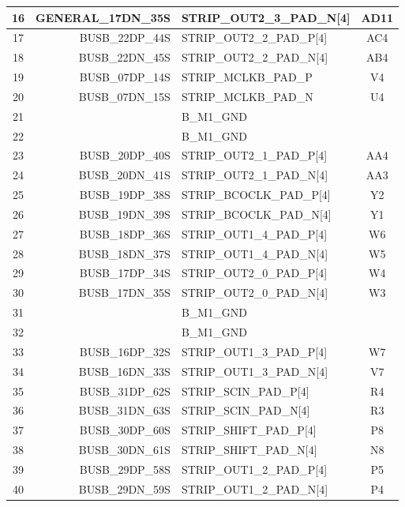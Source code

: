 \documentclass[11pt]{article}
\begin{document}
\begin{table}
\begin{center}
\begin{tabular}{|c|r|l|c|}
16 &GENERAL\_17DN\_35S &  STRIP\_OUT2\_3\_PAD\_N[4]   & AD11  \\ \hline
17 &   BUSB\_22DP\_44S &  STRIP\_OUT2\_2\_PAD\_P[4]   & AC4  \\
18 &   BUSB\_22DN\_45S &  STRIP\_OUT2\_2\_PAD\_N[4]   & AB4  \\ \hline
19 &   BUSB\_07DP\_14S &  STRIP\_MCLKB\_PAD\_P       & V4  \\
20 &   BUSB\_07DN\_15S &  STRIP\_MCLKB\_PAD\_N       & U4  \\ \hline
21 &                 &  B\_M1\_GND                &      \\
22 &                 &  B\_M1\_GND                &      \\ \hline
23 &   BUSB\_20DP\_40S &  STRIP\_OUT2\_1\_PAD\_P[4]   & AA4  \\
24 &   BUSB\_20DN\_41S &  STRIP\_OUT2\_1\_PAD\_N[4]   & AA3  \\ \hline
25 &   BUSB\_19DP\_38S &  STRIP\_BCOCLK\_PAD\_P[4]   & Y2  \\
26 &   BUSB\_19DN\_39S &  STRIP\_BCOCLK\_PAD\_N[4]   & Y1  \\ \hline
27 &   BUSB\_18DP\_36S &  STRIP\_OUT1\_4\_PAD\_P[4]   & W6  \\
28 &   BUSB\_18DN\_37S &  STRIP\_OUT1\_4\_PAD\_N[4]   & W5  \\ \hline
29 &   BUSB\_17DP\_34S &  STRIP\_OUT2\_0\_PAD\_P[4]   & W4  \\
30 &   BUSB\_17DN\_35S &  STRIP\_OUT2\_0\_PAD\_N[4]   & W3  \\ \hline
31 &                 &  B\_M1\_GND                &      \\
32 &                 &  B\_M1\_GND                &      \\ \hline
33 &   BUSB\_16DP\_32S &  STRIP\_OUT1\_3\_PAD\_P[4]   & W7  \\
34 &   BUSB\_16DN\_33S &  STRIP\_OUT1\_3\_PAD\_N[4]   & V7  \\ \hline
35 &   BUSB\_31DP\_62S &  STRIP\_SCIN\_PAD\_P[4]     & R4  \\
36 &   BUSB\_31DN\_63S &  STRIP\_SCIN\_PAD\_N[4]     & R3  \\ \hline
37 &   BUSB\_30DP\_60S &  STRIP\_SHIFT\_PAD\_P[4]    & P8  \\
38 &   BUSB\_30DN\_61S &  STRIP\_SHIFT\_PAD\_N[4]    & N8  \\ \hline
39 &   BUSB\_29DP\_58S &  STRIP\_OUT1\_2\_PAD\_P[4]   & P5  \\
40 &   BUSB\_29DN\_59S &  STRIP\_OUT1\_2\_PAD\_N[4]   & P4  \\ \hline

\end{tabular}
\end{center}
\end{table}
\end{document}
